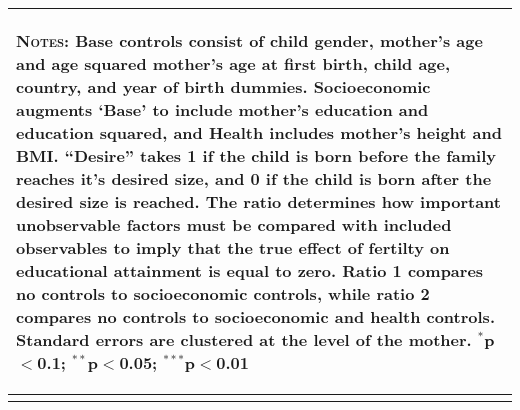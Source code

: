 \begin{landscape}
\begin{table}[!htbp]
\begin{tabular}{lcccccc}
\multicolumn{7}{p{15.8cm}}{\begin{footnotesize}\textsc{Notes:} Base controls consist of child gender, mother's age and age squared mother's age at first birth, child age, country, and year of birth dummies.  Socioeconomic augments `Base' to include mother's education and education squared, and Health includes mother's height and BMI. ``Desire'' takes 1 if the child is born before the family reaches it's desired size, and 0 if the child is born after the desired size is reached. The \citet{Altonjietal2005} ratio determines how important unobservable factors must be compared with included observables to imply that the true effect of fertilty on educational attainment is equal to zero.  Ratio 1 compares no controls to socioeconomic controls, while ratio 2 compares no controls to socioeconomic and health controls. Standard errors are clustered at the level of the mother.
$^{*}$p$<$0.1; $^{**}$p$<$0.05; $^{***}$p$<$0.01\end{footnotesize}}\\  
\bottomrule \normalsize\end{tabular}\end{table}\end{landscape} 
